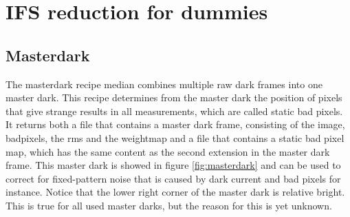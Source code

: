 \documentclass[twoside,single]{lion-msc}
\begin{document}
\clearpage

\section{IFS reduction for dummies}
\subsection{Masterdark}
The masterdark recipe median combines multiple raw dark frames into one master dark. This recipe determines from the master dark the position of pixels that give strange results in all measurements, which are called static bad pixels. It returns both a file that contains a master dark frame, consisting of the image, badpixels, the rms and the weightmap and a file that contains a static bad pixel map, which has the same content as the second extension in the master dark frame. This master dark is showed in figure \ref{fig:masterdark} and can be used to correct for fixed-pattern noise that is caused by dark current and bad pixels for instance. Notice that the lower right corner of the master dark is relative bright. This is true for all used master darks, but the reason for this is yet unknown.
\end{document}
